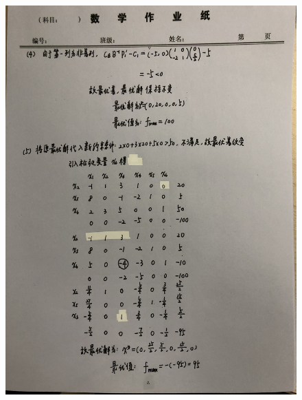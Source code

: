 \documentclass[a4paper]{article}
\begin{document}
\begin{figure}[htbp]
	\centering
	\includegraphics[height=23cm]{6.JPG}
\end{figure}
\end{document}
